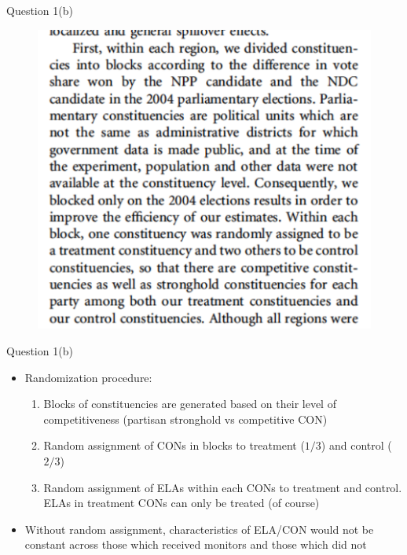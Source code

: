 \documentclass[xcolor=table,dvipsnames]{beamer}
\begin{document}
\begin{frame}{Question 1(b)}
\begin{figure}[H]\centering
\includegraphics[scale=.5]{pictures/ichinoSchuendeln_randomization.pdf}
\end{figure}
\end{frame}

\begin{frame}{Question 1(b)}
\begin{itemize}
\item Randomization procedure: 
\begin{enumerate} 
\item Blocks of constituencies are generated based on their level of competitiveness (partisan stronghold vs competitive CON) \pause
\item Random assignment of CONs in blocks to treatment ($1/3$) and control ($2/3$) \pause
\item Random assignment of ELAs within each CONs to treatment and control. \pause ELAs in treatment CONs can only be treated (of course) \pause 
\end{enumerate}
\item Without random assignment, characteristics of ELA/CON would not be constant across those which received monitors and those which did not \end{itemize}
\end{frame}
\end{document}
